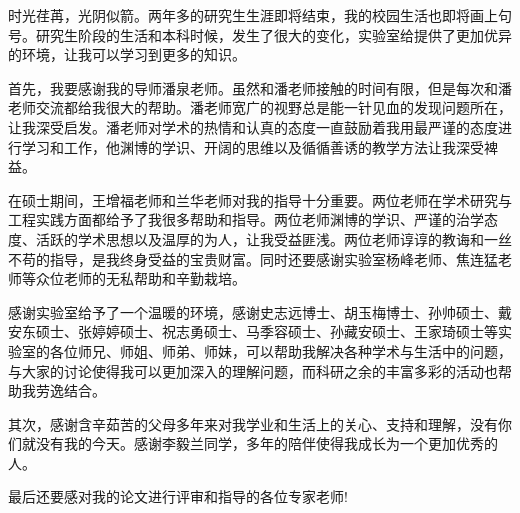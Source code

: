 ﻿%

时光荏苒，光阴似箭。两年多的研究生生涯即将结束，我的校园生活也即将画上句号。研究生阶段的生活和本科时候，发生了很大的变化，实验室给提供了更加优异的环境，让我可以学习到更多的知识。

首先，我要感谢我的导师潘泉老师。虽然和潘老师接触的时间有限，但是每次和潘老师交流都给我很大的帮助。潘老师宽广的视野总是能一针见血的发现问题所在，让我深受启发。潘老师对学术的热情和认真的态度一直鼓励着我用最严谨的态度进行学习和工作，他渊博的学识、开阔的思维以及循循善诱的教学方法让我深受裨益。

在硕士期间，王增福老师和兰华老师对我的指导十分重要。两位老师在学术研究与工程实践方面都给予了我很多帮助和指导。两位老师渊博的学识、严谨的治学态度、活跃的学术思想以及温厚的为人，让我受益匪浅。两位老师谆谆的教诲和一丝不苟的指导，是我终身受益的宝贵财富。同时还要感谢实验室杨峰老师、焦连猛老师等众位老师的无私帮助和辛勤栽培。

感谢实验室给予了一个温暖的环境，感谢史志远博士、胡玉梅博士、孙帅硕士、戴安东硕士、张婷婷硕士、祝志勇硕士、马季容硕士、孙藏安硕士、王家琦硕士等实验室的各位师兄、师姐、师弟、师妹，可以帮助我解决各种学术与生活中的问题，与大家的讨论使得我可以更加深入的理解问题，而科研之余的丰富多彩的活动也帮助我劳逸结合。

其次，感谢含辛茹苦的父母多年来对我学业和生活上的关心、支持和理解，没有你们就没有我的今天。感谢李毅兰同学，多年的陪伴使得我成长为一个更加优秀的人。

最后还要感对我的论文进行评审和指导的各位专家老师!